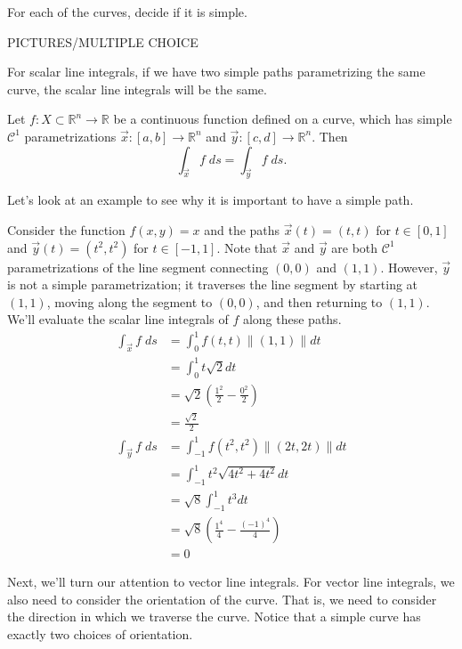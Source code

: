 \documentclass{ximera}
\begin{document}
\begin{example}
For each of the curves, decide if it is simple.

PICTURES/MULTIPLE CHOICE
\end{example}

For scalar line integrals, if we have two simple paths parametrizing the same curve, the scalar line integrals will be the same.

\begin{proposition}
Let $f:X\subset \mathbb{R}^n\rightarrow\mathbb{R}$ be a continuous function defined on a curve, which has simple $\mathcal{C}^1$ parametrizations $\vec{x}:[a,b]\rightarrow\mathbb{R}^n$ and $\vec{y}:[c,d]\rightarrow\mathbb{R}^n$. Then
\[
\int_{\vec{x}} f\;ds = \int_{\vec{y}} f\;ds.
\]
\end{proposition}

Let's look at an example to see why it is important to have a simple path.

\begin{example}
Consider the function $f(x,y) = x$ and the paths $\vec{x}(t) = (t,t)$ for $t\in [0,1]$ and $\vec{y}(t)=(t^2,t^2)$ for $t\in [-1,1]$. Note that $\vec{x}$ and $\vec{y}$ are both $\mathcal{C}^1$ parametrizations of the line segment connecting $(0,0)$ and $(1,1)$. However, $\vec{y}$ is not a simple parametrization; it traverses the line segment by starting at $(1,1)$, moving along the segment to $(0,0)$, and then returning to $(1,1)$. We'll evaluate the scalar line integrals of $f$ along these paths.
\begin{align*}
\int_{\vec{x}} f\;ds &= \int_0^1 f(t,t)\|(1,1)\|dt\\
&= \int_0^1 t\sqrt{2}dt\\
&= \sqrt{2}\left(\frac{1^2}{2}-\frac{0^2}{2}\right)\\
&= \frac{\sqrt{2}}{2}\\
\int_{\vec{y}} f\;ds &= \int_{-1}^1 f(t^2,t^2)\|(2t,2t)\|dt\\
&= \int_{-1}^1 t^2\sqrt{4t^2+4t^2}dt\\
&= \sqrt{8}\int_{-1}^1 t^3dt\\
&= \sqrt{8}\left(\frac{1^4}{4} - \frac{(-1)^4}{4}\right)\\
&= 0
\end{align*}
\end{example}

Next, we'll turn our attention to vector line integrals. For vector line integrals, we also need to consider the orientation of the curve. That is, we need to consider the direction in which we traverse the curve. Notice that a simple curve has exactly two choices of orientation.
\end{document}
